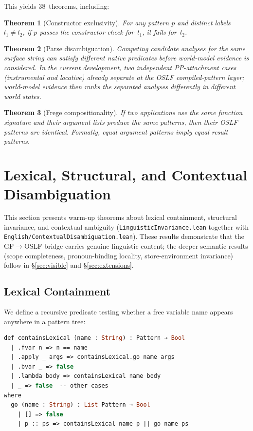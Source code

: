 \documentclass[11pt]{article}
\newtheorem{theorem}{Theorem}
\newcommand{\code}[1]{\texttt{#1}}
\newcommand{\OSLF}{\textup{OSLF}}
\newcommand{\GF}{\textup{GF}}
\begin{document}
This yields 38~theorems, including:

\begin{theorem}[Constructor exclusivity]
For any pattern $p$ and distinct labels $l_1 \neq l_2$, if $p$ passes the
constructor check for~$l_1$, it fails for~$l_2$.
\end{theorem}

\begin{theorem}[Parse disambiguation]
Competing candidate analyses for the same surface string can satisfy different
native predicates before world-model evidence is considered.  In the current
development, two independent PP-attachment cases (instrumental and locative)
already separate at the OSLF compiled-pattern layer; world-model evidence
then ranks the separated analyses differently in different world states.
\end{theorem}

\begin{theorem}[Frege compositionality]
If two applications use the same function signature and their argument lists
produce the same patterns, then their \OSLF{} patterns are identical.
Formally, equal argument patterns imply equal result patterns.
\end{theorem}

\section{Lexical, Structural, and Contextual Disambiguation}
\label{sec:invariance}

This section presents warm-up theorems about lexical containment,
structural invariance, and contextual ambiguity
(\code{LinguisticInvariance.lean} together with
\code{English/ContextualDisambiguation.lean}).  These results demonstrate that the
\GF{}$\to$\OSLF{} bridge carries genuine linguistic content; the deeper
semantic results (scope completeness, pronoun-binding locality,
store-environment invariance) follow in \S\ref{sec:visible} and
\S\ref{sec:extensions}.

\subsection{Lexical Containment}

We define a recursive predicate testing whether a free variable name
appears anywhere in a pattern tree:

\begin{lstlisting}[language=ml,caption={Recursive lexical containment}]
def containsLexical (name : String) : Pattern → Bool
  | .fvar n => n == name
  | .apply _ args => containsLexical.go name args
  | .bvar _ => false
  | .lambda body => containsLexical name body
  | _ => false  -- other cases
where
  go (name : String) : List Pattern → Bool
    | [] => false
    | p :: ps => containsLexical name p || go name ps
\end{lstlisting}
\end{document}

